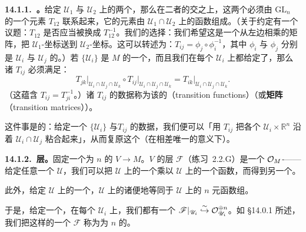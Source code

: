 \textbf{14.1.1.\ \trTransitionFunction。}\quad 给定 $\mathscr{U}_1$ 与 $\mathscr{U}_2$ 上的两个\trTrivialization，那么在二者的交之上，这两个\trTrivialization{}必须由 $\mathrm{GL}_n$ 的一个元素 $T_{12}$ 联系起来，它的元素由 $\mathscr{U}_1\cap\mathscr{U}_2$ 上的函数组成。（关于约定有一个议题：$T_{12}$ 是否应当被换成 $T_{12}^{-1}$。我们的选择：我们希望这是一个从左边相乘的矩阵，把 $\mathscr{U}_1$-坐标送到 $\mathscr{U}_2$-坐标。这可以转述为：$T_{ij}=\phi_j\circ\phi_i^{-1}$，其中 $\phi_i$ 与 $\phi_j$ 分别是 $\mathscr{U}_i$ 与 $\mathscr{U}_j$ 的\trTrivialization{}。）若 $\{\mathscr{U}_i\}$ 是 $M$ 的一个\trCover，而且我们在每个 $\mathscr{U}_i$ 上都给定了\trTrivialization，那么诸 $T_{ij}$ 必须满足\trCocycleCondition：
\begin{equation*}\tag{14.1.1.1}\label{eq:cocycle-condition-vb}
T_{jk}\vert_{\mathscr{U}_i\cap\mathscr{U}_j\cap\mathscr{U}_k}\circ T_{ij}\vert_{\mathscr{U}_i\cap\mathscr{U}_j\cap\mathscr{U}_k}
=T_{ik}\vert_{\mathscr{U}_i\cap\mathscr{U}_j\cap\mathscr{U}_k}.
\end{equation*}
（这蕴含 $T_{ij}=T_{ji}^{-1}$。）诸 $T_{ij}$ 的数据称为该\trTrivialization{}的\textbf{\trTransitionFunction}（transition functions）（或\textbf{\trTransitionFunction{}矩阵}（transition matrices））。

这件事是\trInvertible{}的：给定一个\trCover{} $\{\mathscr{U}_i\}$ 与\trTransitionFunction $T_{ij}$ 的数据，我们便可以「用 $T_{ij}$ 把各个 $\mathscr{U}_i\times\mathbb{R}^n$ 沿着 $\mathscr{U}_i\cap\mathscr{U}_j$ 粘合起来」，从而复原这个\trVectorBundle（在相差唯一\trIsomorphism{}的意义下）。

\textbf{14.1.2.\ \trSection{}层。}\quad 固定一个\trRank{}为 $n$ 的\trVectorBundle{} $V\to M$。$V$ 的\trSection{}层 $\mathscr{F}$（\mbox{练习~2.2.G}）是一个 $\mathcal{O}_M$-\trModule——给定任意一个\trOpenSet{} $\mathscr{U}$，我们可以把 $\mathscr{U}$ 上的一个\trSection{}乘以 $\mathscr{U}$ 上的一个函数，而得到另一个\trSection。

此外，给定 $\mathscr{U}$ 上的一个\trTrivialization，$\mathscr{U}$ 上的诸\trSection{}便\trNatural{}地等同于 $\mathscr{U}$ 上的 $n$ 元函数组。
\begin{center}
\end{center}
于是，给定一个\trTrivialization，在每个\trOpenSet{} $\mathscr{U}_i$ 上，我们都有一个\trIsomorphism{} $\mathscr{F}\vert_{\mathscr{U}_i}\overset{\sim}{\hookrightarrow}\mathcal{O}_{\mathscr{U}_i}^{\oplus n}$。如 \S14.0.1 所述，我们把这样的一个 $\mathscr{F}$ 称为\trRank{}为 $n$ 的\trLocallyFreeSheaf。

